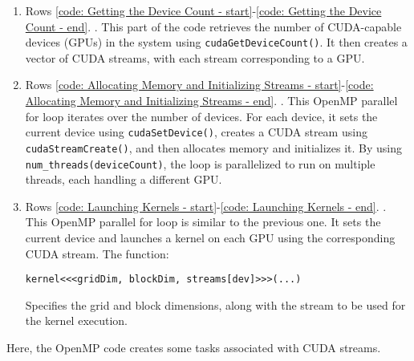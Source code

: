 \begin{enumerate}
    \item Rows \ref{code: Getting the Device Count - start}-\ref{code: Getting the Device Count - end}. . This part of the code retrieves the number of CUDA-capable devices (GPUs) in the system using \texttt{cudaGetDeviceCount()}. It then creates a vector of CUDA streams, with each stream corresponding to a GPU.
    
    \item Rows \ref{code: Allocating Memory and Initializing Streams - start}-\ref{code: Allocating Memory and Initializing Streams - end}. . This OpenMP parallel for loop iterates over the number of devices. For each device, it sets the current device using \texttt{cudaSetDevice()}, creates a CUDA stream using \texttt{cudaStreamCreate()}, and then allocates memory and initializes it. By using \texttt{num\_threads(deviceCount)}, the loop is parallelized to run on multiple threads, each handling a different GPU.

    \item Rows \ref{code: Launching Kernels - start}-\ref{code: Launching Kernels - end}. . This OpenMP parallel for loop is similar to the previous one. It sets the current device and launches a kernel on each GPU using the corresponding CUDA stream. The function:
    \begin{center}
        \texttt{kernel<<<gridDim, blockDim, streams[dev]>>>(...)}
    \end{center}
    Specifies the grid and block dimensions, along with the stream to be used for the kernel execution.
\end{enumerate}
Here, the OpenMP code creates some tasks associated with CUDA streams.

